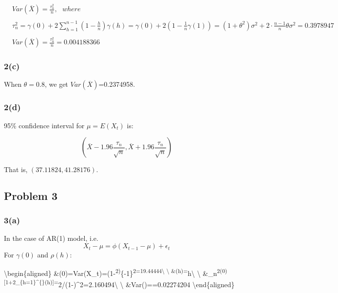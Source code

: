 \documentclass[
]{article}
\begin{document}
\begin{align}

&Var(\overline{X})=\frac{\tau_n^2}{n}, \ \ \ where \\
\\
&\tau^2_n=\gamma(0)+2\sum_{h=1}^{n-1}(1-\frac{h}{n})\gamma(h)=\gamma(0)+2(1-\frac{1}{n}\gamma(1))=(1+\theta^2)\sigma^2+2\cdot\frac{n-1}{n}\theta\sigma^2=0.3978947\\
\\
&Var(\overline{X})=\frac{\tau_n^2}{n}=0.004188366
\end{align}

\hypertarget{c}{%
\subsubsection{2(c)}\label{c}}

When \(\theta=0.8\), we get \(Var(\overline{X})\)=0.2374958.

\hypertarget{d}{%
\subsubsection{2(d)}\label{d}}

95\% confidence interval for \(\mu=E(X_t)\) is:

\[
(\overline{X}-1.96\frac{\tau_n}{\sqrt{n}},\overline{X}+1.96\frac{\tau_n}{\sqrt{n}})
\]

That is, \((37.11824,41.28176)\).

\hypertarget{problem-3}{%
\subsection{Problem 3}\label{problem-3}}

\hypertarget{a-1}{%
\subsubsection{3(a)}\label{a-1}}

In the case of AR(1) model, i.e. \[
X_t-\mu=\phi(X_{t-1}-\mu)+\epsilon_t
\] For \(\gamma(0)\) and \(\rho(h)\):

\textbackslash begin\{aligned\}
\&\gamma(0)=Var(X\_t)=(1-\phi\textsuperscript{2)}\{-1\}\sigma\textsuperscript{2=19.44444\textbackslash{}
\textbackslash{} \&\rho(h)=\phi}h\textbackslash{} \textbackslash{}
\&\tau\_n\textsuperscript{2\approx\gamma(0){[}1+2\sum\_\{h=1\}\^{}\{\infty\}\rho(h){]}=\sigma}2/(1-\phi)\^{}2=2.160494\textbackslash{}
\textbackslash{} \&Var()==0.02274204
\textbackslash end\{aligned\}
\end{document}
